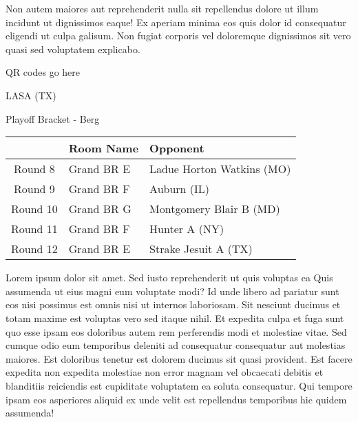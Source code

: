 \documentclass{article}%
\begin{document}
\newline%
Non autem maiores aut reprehenderit nulla sit repellendus dolore ut illum incidunt ut dignissimos eaque! Ex aperiam minima eos quis dolor id consequatur eligendi ut culpa galisum. Non fugiat corporis vel doloremque dignissimos sit vero quasi sed voluptatem explicabo.\newline%
\newline%
%
\vspace*{30pt}%
\begin{center}%
\begin{Huge}%
QR codes go here%
\end{Huge}%
\end{center}%
\newpage%
\begin{center}%
\begin{Huge}%
LASA (TX)%
\end{Huge}%
\vspace*{8pt}%
\linebreak%
\begin{Large}%
Playoff Bracket {-} Berg%
\end{Large}%
\end{center}%
%
\begin{tabularx}{\textwidth}{|c|Y|Y|}%
\hline%
&Room Name&Opponent\\%
\hline%
Round 8&Grand BR E&Ladue Horton Watkins (MO)\\%
Round 9&Grand BR F&Auburn (IL)\\%
Round 10&Grand BR G&Montgomery Blair B (MD)\\%
Round 11&Grand BR F&Hunter A (NY)\\%
Round 12&Grand BR E&Strake Jesuit A (TX)\\%
\hline%
\end{tabularx}%
\vspace*{8pt}%
\linebreak%
\newline%
\newline%
Lorem ipsum dolor sit amet. Sed iusto reprehenderit ut quis voluptas ea Quis assumenda ut eius magni eum voluptate modi? Id unde libero ad pariatur sunt eos nisi possimus est omnis nisi ut internos laboriosam. Sit nesciunt ducimus et totam maxime est voluptas vero sed itaque nihil. Et expedita culpa et fuga sunt quo esse ipsam eos doloribus autem rem perferendis modi et molestiae vitae.\newline%
\newline%
Sed cumque odio eum temporibus deleniti ad consequatur consequatur aut molestias maiores. Est doloribus tenetur est dolorem ducimus sit quasi provident. Est facere expedita non expedita molestiae non error magnam vel obcaecati debitis et blanditiis reiciendis est cupiditate voluptatem ea soluta consequatur. Qui tempore ipsam eos asperiores aliquid ex unde velit est repellendus temporibus hic quidem assumenda!\newline%
\end{document}
